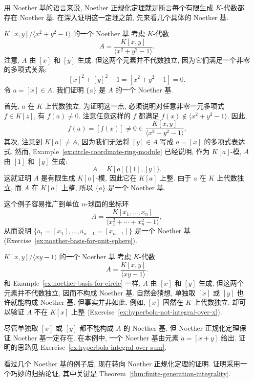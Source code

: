用 Noether 基的语言来说, Noether 正规化定理就是断言每个有限生成 $K$-代数都存在 Noether 基. 在深入证明这一定理之前, 先来看几个具体的 Noether 基.

\begin{Example}{{\textmd{$K[x,y]/\langle x^{2}+y^{2}-1\rangle$} 的一个 Noether 基}}\leavevmode\label{ex:noether-basis-for-circle}
考虑 $K$-代数
\[
  A=\frac{K[x,y]}{\langle x^{2}+y^{2}-1\rangle}.
\]
注意, $A$ 由 $[x]$ 和 $[y]$ 生成. 但这两个元素并不代数独立, 因为它们满足一个非零的多项式关系:
\[
  [x]^{2}+[y]^{2}-1=[x^{2}+y^{2}-1]=0.
\]
令 $a=[x]\in A$. 我们证明 $\{a\}$ 是 $A$ 的一个 Noether 基.

首先, $a$ 在 $K$ 上代数独立. 为证明这一点, 必须说明对任意非零一元多项式 $f\in K[z]$, 有 $f(a)\neq0$. 注意任意这样的 $f$ 都满足 $f(x)\notin\langle x^{2}+y^{2}-1\rangle$. 因此,
\[
  f(a)=[f(x)]\neq0\in\frac{K[x,y]}{\langle x^{2}+y^{2}-1\rangle}.
\]
其次, 注意到 $K[a]\neq A$, 因为我们无法将 $[y]\in A$ 写成 $a=[x]$ 的多项式表达式. 然而, Example~\ref{ex:circle-coordinate-ring-module} 已经说明, 作为 $K[a]$-模, $A$ 由 $[1]$ 和 $[y]$ 生成:
\[
  A=K[a]\{[1],[y]\}.
\]
这就证明 $A$ 是有限生成 $K[a]$-模, 因此它在 $K[a]$ 上整. 由于 $a$ 在 $K$ 上代数独立, 而 $A$ 在 $K[a]$ 上整, 所以 $\{a\}$ 是一个 Noether 基.

这个例子容易推广到单位 $n$-球面的坐标环
\[
  A=\frac{K[x_{1},\ldots,x_{n}]}{\langle x_{1}^{2}+\cdots+x_{n}^{2}-1\rangle},
\]
从而说明 $\{a_{1}=[x_{1}],\ldots,a_{n-1}=[x_{n-1}]\}$ 是一个 Noether 基 (Exercise~\ref{ex:noether-basis-for-unit-sphere}).
\end{Example}

\begin{Example}{{\textmd{$K[x,y]/\langle xy-1\rangle$} 的一个 Noether 基}}\leavevmode\label{ex:noether-basis-for-hyperbola}
考虑 $K$-代数
\[
  A=\frac{K[x,y]}{\langle xy-1\rangle}.
\]
和 Example~\ref{ex:noether-basis-for-circle} 一样, $A$ 由 $[x]$ 和 $[y]$ 生成, 但这两个元素并不代数独立, 因而不构成 Noether 基. 自然会猜想, 单独取 $[x]$ 或 $[y]$ 也许就能构成 Noether 基. 但事实并非如此. 例如, $[x]$ 固然在 $K$ 上代数独立, 却可以验证 $A$ 不在 $K[x]$ 上整 (Exercise~\ref{ex:hyperbola-not-integral-over-x}).

尽管单独取 $[x]$ 或 $[y]$ 都不能构成 $A$ 的 Noether 基, 但 Noether 正规化定理保证 Noether 基一定存在. 在本例中, 一个 Noether 基由元素 $a=[x+y]$ 给出. 证明的思路见 Exercise~\ref{ex:hyperbola-integral-over-sum}.
\end{Example}

看过几个 Noether 基的例子后, 现在转向 Noether 正规化定理的证明. 证明采用一个巧妙的归纳论证, 其中关键是 Theorem~\ref{thm:finite-generation-integrality}.

